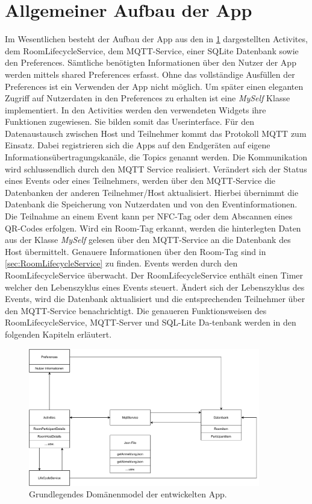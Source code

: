 \section{Allgemeiner Aufbau der App}
\label{sec:AadA}
Im Wesentlichen besteht der Aufbau der App aus den in \cref{img:dmodel} dargestellten Activites, dem RoomLifecycleService, dem MQTT-Service, einer SQLite Datenbank sowie den Preferences. 
Sämtliche benötigten Informationen über den Nutzer der App werden mittels shared Preferences erfasst. 
Ohne das vollständige Ausfüllen der Preferences ist ein Verwenden der App nicht möglich. 
Um später einen eleganten Zugriff auf Nutzerdaten in den Preferences zu erhalten ist eine \textit{MySelf} Klasse implementiert. 
In den Activities werden den verwendeten Widgets ihre Funktionen zugewiesen.
Sie bilden somit das Userinterface. 
Für den Datenaustausch zwischen Host und Teilnehmer kommt das Protokoll MQTT zum Einsatz.
Dabei registrieren sich die Apps auf den Endgeräten auf eigene Informationsübertragungskanäle, die Topics genannt werden.
Die Kommunikation wird schlussendlich durch den MQTT Service realisiert.
Verändert sich der Status eines Events oder eines Teilnehmers, werden über den MQTT-Service die Datenbanken der anderen Teilnehmer/Host aktualisiert. 
Hierbei übernimmt die Datenbank die Speicherung von Nutzerdaten und von den Eventinformationen. 
Die Teilnahme an einem Event kann per NFC-Tag oder dem Abscannen eines QR-Codes erfolgen. 
Wird ein Room-Tag erkannt, werden die hinterlegten Daten aus der Klasse \textit{MySelf} gelesen über den MQTT-Service an die Datenbank des Host übermittelt. 
Genauere Informationen über den Room-Tag sind in \cref{sec:RoomLifecycleService} zu finden.
Events werden durch den RoomLifecycleService überwacht. 
Der RoomLifecycleService enthält einen Timer welcher den Lebenszyklus eines Events steuert. 
Ändert sich der Lebenszyklus des Events, wird die Datenbank aktualisiert und die entsprechenden Teilnehmer über den MQTT-Service benachrichtigt. 
Die genaueren Funktionsweisen des RoomLifecycleService, MQTT-Server und SQL-Lite Da-tenbank werden in den folgenden Kapiteln erläutert.
\begin{figure}
	\centering
	\includegraphics[width =0.9\textwidth]{images/DomaenenModel.pdf}
	\caption{Grundlegendes Domänenmodel der entwickelten App.}
	\label{img:dmodel}
\end{figure}


